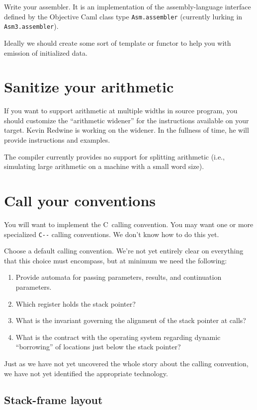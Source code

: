 \documentclass[12pt]{article}
\newcommand\PAL{\texttt{C-{}-}}
\begin{document}
Write your assembler.
It is an implementation of the assembly-language interface defined by
the Objective Caml class type 
\texttt{Asm.assembler} (currently lurking in \texttt{Asm3.assembler}).

Ideally we should create some sort of template or functor to help you
with emission of initialized data.


\section{Sanitize your arithmetic}

If you want to support arithmetic at multiple widths in source
program, you should customize the ``arithmetic widener'' for the
instructions available on 
your target.
Kevin Redwine is working on the widener.
In the fullness of time, he will provide instructions and
examples.

The compiler currently provides no support for splitting arithmetic
(i.e., simulating large arithmetic on a machine with a small word size).

\section{Call your conventions}

You will want to implement the C~calling convention.
You may want one
or more specialized {\PAL} calling conventions.
We don't know how to do this yet.

Choose a default calling convention.
We're not yet entirely clear on everything that this choice must
encompass, but at minimum we need the following:
\begin{enumerate}
\item
Provide automata for passing parameters, results, and continuation parameters.
\item
Which register holds the stack pointer?
\item
What is the invariant governing the alignment of the stack pointer at
calls?
\item
What is the contract with the operating system regarding dynamic
``borrowing'' of locations just below the stack pointer?
\end{enumerate}
Just as we have not yet uncovered the whole story about the calling
convention, we have not yet identified the appropriate technology.


\subsection{Stack-frame layout}
\end{document}
